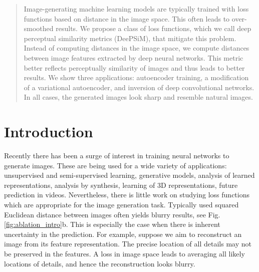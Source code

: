 \documentclass{article}
\newcommand{\TODO}[1]{{\color{dblue}[TODO #1]}}
\begin{document}
 


\begin{abstract}
Image-generating machine learning models are typically trained with loss functions based on distance in the image space.
This often leads to over-smoothed results.
We propose a class of loss functions, which we call deep perceptual similarity metrics (DeePSiM), that mitigate this problem. 
Instead of computing distances in the image space, we compute distances between image features extracted by deep neural networks.
This metric better reflects perceptually similarity of images and thus leads to better results.
We show three applications: autoencoder training, a modification of a variational autoencoder, and inversion of deep convolutional networks.
In all cases, the generated images look sharp and resemble natural images.
\end{abstract}


\section{Introduction}
Recently there has been a surge of interest in training neural networks to generate images.
These are being used for a wide variety of applications: unsupervised and semi-supervised learning, generative models, analysis of learned representations, analysis by synthesis, learning of 3D representations, future prediction in videos.
Nevertheless, there is little work on studying loss functions which are appropriate for the image generation task.
Typically used squared Euclidean distance between images often yields blurry results, see Fig.\ref{fig:ablation_intro}b.
This is especially the case when there is inherent uncertainty in the prediction.
For example, suppose we aim to reconstruct an image from its feature representation.
The precise location of all details may not be preserved in the features.
A loss in image space leads to averaging all likely locations of details, and hence the reconstruction looks blurry.
\end{document}
